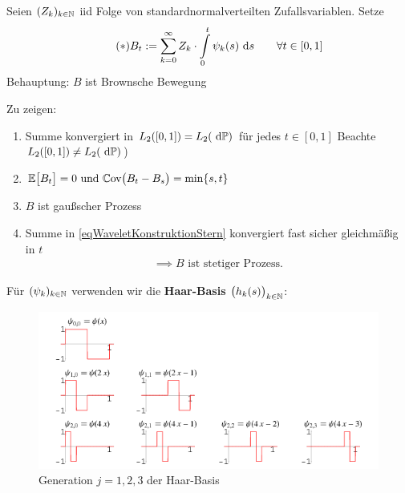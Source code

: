 \begin{theorem}\label{theorem10.2}
	Seien $(Z_k)_{k\in\mathbb{N}}$ iid Folge von standardnormalverteilten Zufallsvariablen. Setze
	\begin{align}\label{eqWaveletKonstruktionStern}\tag{$\ast$}
		B_t:=\sum\limits_{k=0}^\infty Z_k\cdot\int\limits_0^t\psi_k(s)\text{ d} s\qquad\forall t\in[0,1]
	\end{align}
	Behauptung: $B$ ist Brownsche Bewegung
\end{theorem}

Zu zeigen:
\begin{enumerate}[label=\alph*)]
	\item Summe konvergiert in $L_2([0,1])=L_2(\text{ d}\mathbb{P})$ für jedes $t\in[0,1]$ Beachte $L_2([0,1])\neq L_2(\text{ d}\mathbb{P})$)
	\item $\begin{aligned}
		\mathbb{E}\big[B_t\big]=0\text{ und }\mathbb{C}\text{ov}\big(B_t-B_s\big)=\min\lbrace s,t\rbrace
	\end{aligned}$
	\item $B$ ist gaußscher Prozess
	\item Summe in \eqref{eqWaveletKonstruktionStern} konvergiert fast sicher gleichmäßig in $t$
	\begin{align*}
		\implies B\text{ ist stetiger Prozess.}
	\end{align*}
\end{enumerate}

Für $(\psi_k)_{k\in\mathbb{N}}$ verwenden wir die \textbf{Haar-Basis} $\big(h_k(s)\big)_{k\in\mathbb{N}}$:

\begin{figure}[H]
	\begin{center}
		\includegraphics[width=1\textwidth]{./pics/Haar.png}
		\caption{Generation $j=1,2,3$ der Haar-Basis}
		\label{AbbHaarBasis}
	\end{center}
\end{figure}

